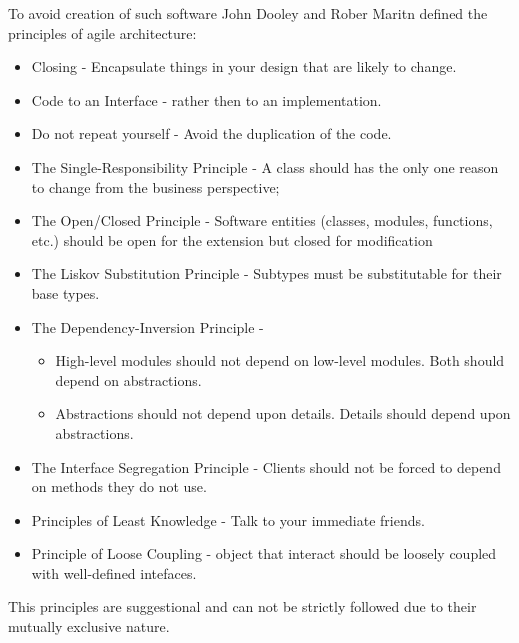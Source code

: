 To avoid creation of such software John Dooley \cite{Dooley} and Rober Maritn \cite{MartinASD} defined  the principles of agile architecture:
\begin{itemize}
	\item Closing - Encapsulate things in your design that are likely to change.
	\item Code to an Interface - rather then to an implementation. 
	\item Do not repeat yourself - Avoid the duplication of the code.
	\item The Single-Responsibility Principle - A class should has the only one reason to change from the business perspective;
	\item The Open/Closed Principle - Software entities (classes, modules, functions, etc.) should be open for the extension but closed for modification
	\item The Liskov Substitution Principle - Subtypes must be substitutable for their base types.
	\item The Dependency-Inversion Principle - 		
	\begin{itemize}
		\item High-level modules should not depend on low-level modules.  Both should depend on abstractions. 
		\item Abstractions should not depend upon details. Details should depend upon abstractions.
	\end{itemize}
	\item The Interface Segregation Principle - Clients should not be forced to depend on methods they do not use.
	\item Principles of Least Knowledge - Talk to your immediate friends. 
	\item Principle of Loose Coupling - object that interact should be loosely coupled with well-defined intefaces.
\end{itemize}

This principles are suggestional and can not be strictly followed due to their mutually exclusive nature.

